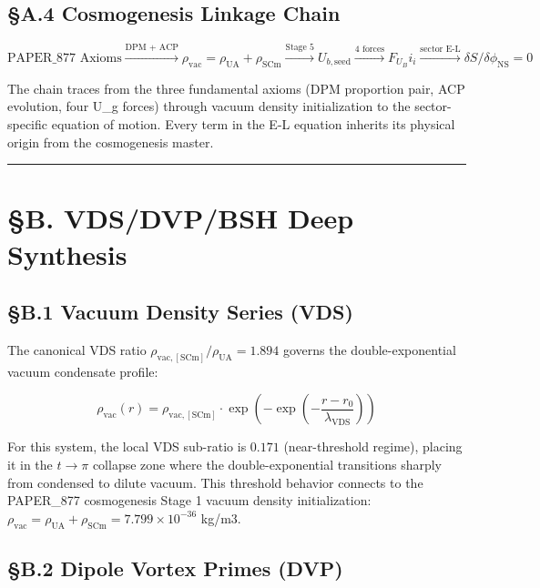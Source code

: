\documentclass[12pt,a4paper]{article}
\begin{document}
\subsection{\S{}A.4 Cosmogenesis Linkage Chain}

\begin{equation}
\text{PAPER\_877 Axioms} \xrightarrow{\text{DPM + ACP}} \rho_{\mathrm{vac}} = \rho_{\mathrm{UA}} + \rho_{\mathrm{SCm}} \xrightarrow{\text{Stage 5}} U_{b,\mathrm{seed}} \xrightarrow{\text{4 forces}} F_U_Bi_i \xrightarrow{\text{sector E-L}} \delta S/\delta \phi_{\mathrm{NS}} = 0
\end{equation}

The chain traces from the three fundamental axioms (DPM proportion pair, ACP evolution, four U\_g forces) through vacuum density initialization to the sector-specific equation of motion. Every term in the E-L equation inherits its physical origin from the cosmogenesis master.

\medskip\hrule\medskip

\section{\S{}B. VDS/DVP/BSH Deep Synthesis}

\subsection{\S{}B.1 Vacuum Density Series (VDS)}

The canonical VDS ratio $\rho_{\mathrm{vac,[SCm]}} / \rho_{\mathrm{UA}} = 1.894$ governs the double-exponential vacuum condensate profile:

\begin{equation}
\rho_{\mathrm{vac}}(r) = \rho_{\mathrm{vac,[SCm]}} \cdot \exp\!\left(-\exp\!\left(-\frac{r - r_0}{\lambda_{\mathrm{VDS}}}\right)\right)
\end{equation}

For this system, the local VDS sub-ratio is $0.171$ (near-threshold regime), placing it in the $t \to \pi$ collapse zone where the double-exponential transitions sharply from condensed to dilute vacuum. This threshold behavior connects to the PAPER\_877 cosmogenesis Stage 1 vacuum density initialization: $\rho_{\mathrm{vac}} = \rho_{\mathrm{UA}} + \rho_{\mathrm{SCm}} = 7.799 \times 10^{-36}$ kg/m3.

\subsection{\S{}B.2 Dipole Vortex Primes (DVP)}
\end{document}
